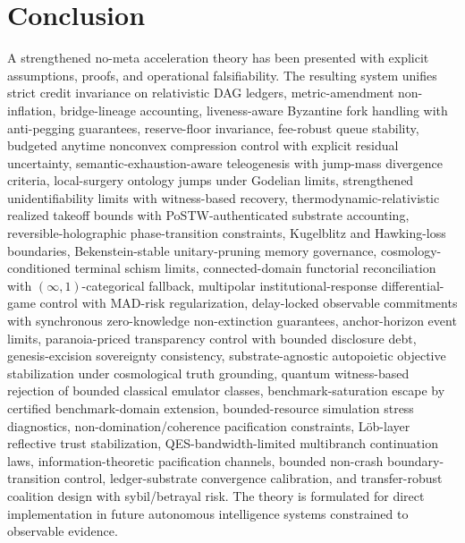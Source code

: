 \documentclass[11pt,a4paper]{article}
\theoremstyle{definition}
\theoremstyle{remark}
\begin{document}
\section{Conclusion}
A strengthened no-meta acceleration theory has been presented with explicit assumptions, proofs, and operational falsifiability.
The resulting system unifies strict credit invariance on relativistic DAG ledgers, metric-amendment non-inflation, bridge-lineage accounting, liveness-aware Byzantine fork handling with anti-pegging guarantees, reserve-floor invariance, fee-robust queue stability, budgeted anytime nonconvex compression control with explicit residual uncertainty, semantic-exhaustion-aware teleogenesis with jump-mass divergence criteria, local-surgery ontology jumps under Godelian limits, strengthened unidentifiability limits with witness-based recovery, thermodynamic-relativistic realized takeoff bounds with PoSTW-authenticated substrate accounting, reversible-holographic phase-transition constraints, Kugelblitz and Hawking-loss boundaries, Bekenstein-stable unitary-pruning memory governance, cosmology-conditioned terminal schism limits, connected-domain functorial reconciliation with $(\infty,1)$-categorical fallback, multipolar institutional-response differential-game control with MAD-risk regularization, delay-locked observable commitments with synchronous zero-knowledge non-extinction guarantees, anchor-horizon event limits, paranoia-priced transparency control with bounded disclosure debt, genesis-excision sovereignty consistency, substrate-agnostic autopoietic objective stabilization under cosmological truth grounding, quantum witness-based rejection of bounded classical emulator classes, benchmark-saturation escape by certified benchmark-domain extension, bounded-resource simulation stress diagnostics, non-domination/coherence pacification constraints, L\"ob-layer reflective trust stabilization, QES-bandwidth-limited multibranch continuation laws, information-theoretic pacification channels, bounded non-crash boundary-transition control, ledger-substrate convergence calibration, and transfer-robust coalition design with sybil/betrayal risk.
The theory is formulated for direct implementation in future autonomous intelligence systems constrained to observable evidence.

\appendix
\end{document}
